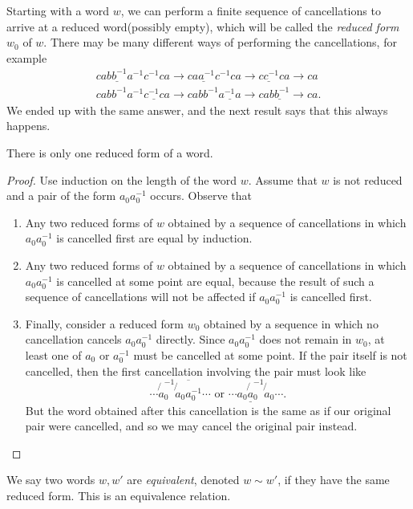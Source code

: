 Starting with a word \( w \), we can perform a finite sequence of cancellations to arrive at a reduced word(possibly empty), which will be called the \emph{reduced form} \( w_0 \) of \( w \).
There may be many different ways of performing the cancellations, for example
\begin{align*}
  ca\underline{bb^{-1}}a^{-1}c^{-1}ca \to c\underline{aa^{-1}}c^{-1}ca \to \underline{cc^{-1}}ca \to ca\\
  cabb^{-1}a^{-1}\underline{c^{-1}c} a\to ca bb^{-1} \underline{a^{-1}a} \to  ca \underline{bb^{-1}} \to ca.
\end{align*}
We ended up with the same answer, and the next result says that this always happens.
\begin{proposition}
  \label{proposition-unique-reduced-form}
  There is only one reduced form of a word.
\end{proposition}
\begin{proof}
  Use induction on the length of the word \( w \).
  Assume that \( w \) is not reduced and a pair of the form \( a_0 a^{-1}_0 \) occurs.
  Observe that
  \begin{enumerate}
    \item Any two reduced forms of \( w \) obtained by a sequence of cancellations in which \( a_0 a_0^{-1} \) is cancelled first are equal by induction.
    \item Any two reduced forms of \( w \) obtained by a sequence of cancellations in which \( a_0 a^{-1}_0 \) is cancelled at some point are equal, because the result of such a sequence of cancellations will not be affected if \( a_0 a_0^{-1} \) is cancelled first.
    \item Finally, consider a reduced form \( w_0 \) obtained by a sequence in which no cancellation cancels \( a_0 a_0^{-1} \) directly.
      Since \( a_0 a_0^{-1} \) does not remain in \( w_0 \), at least one of \( a_0 \) or \( a_0^{-1} \) must be cancelled at some point.
      If the pair itself is not cancelled, then the first cancellation involving the pair must look like
      \[
        \cdots \not{a}_0^{-1} \overline{\not{a}_0a_0^{-1}} \cdots \text{ or } \cdots \underline{a_0 \not{a}_0^{-1}} \not{a}_0 \cdots.
      \]
      But the word obtained after this cancellation is the same as if our original pair were cancelled, and so we may cancel the original pair instead.
  \end{enumerate}
\end{proof}


\begin{definition}
  \label{definition-equivalent-word}
  We say two words \( w, w' \) are \emph{equivalent}, denoted \( w \sim w' \), if they have the same reduced form.
  This is an equivalence relation.
\end{definition}

